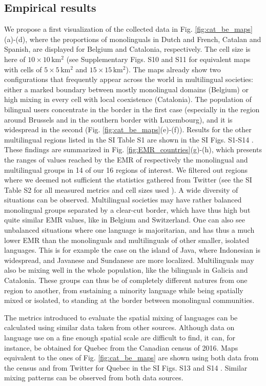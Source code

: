 \documentclass[../thesis.tex]{subfiles}
\begin{document}
\subsection{Empirical results}
We propose a first visualization of the collected data in Fig.
\ref{fig:cat_be_maps}(a)-(d), where the proportions of
monolinguals in Dutch and French, Catalan and Spanish, are displayed for Belgium and
Catalonia, respectively. The cell size is here of $10 \times 10 \, \si{\kilo \meter
\squared}$ (see Supplementary Figs. S10 and S11 \cite{supp} for equivalent maps with
cells of $5 \times 5 \, \si{\kilo \meter \squared}$ and $15 \times 15 \, \si{\kilo
\meter \squared}$). The maps already show two configurations that frequently appear
across the world in multilingual societies: either a marked boundary between mostly
monolingual domains (Belgium) or high mixing in every cell with local coexistence
(Catalonia). The population of bilingual users concentrate in the border in the first
case (especially in the region around Brussels and in the southern border with
Luxembourg), and it is widespread in the second (Fig.
\ref{fig:cat_be_maps}(e)-(f)). Results for the other
multilingual regions listed in the SI Table S1 are shown in the SI Figs. S1-S14
\cite{supp}. These findings are summarized in Fig.
\ref{fig:EMR_countries}(g)-(h), which presents the ranges of
values reached by the EMR of respectively the monolingual and multilingual groups in 14
of our 16 regions of interest. We filtered out regions where we deemed not sufficient
the statistics gathered from Twitter (see the SI Table S2 for all measured metrics and
cell sizes used \cite{supp}). A wide diversity of situations can be observed.
Multilingual societies may have rather balanced monolingual groups separated by a
clear-cut border, which have thus high but quite similar EMR values, like in Belgium and
Switzerland. One can also see unbalanced situations where one language is majoritarian,
and has thus a much lower EMR than the monolinguals and multilinguals of other smaller,
isolated languages. This is for example the case on the island of Java, where Indonesian
is widespread, and Javanese and Sundanese are more localized. Multilinguals may also be
mixing well in the whole population, like the bilinguals in Galicia and Catalonia. These
groups can thus be of completely different natures from one region to another, from
sustaining a minority language while being spatially mixed or isolated, to standing at
the border between monolingual communities.

The metrics introduced to evaluate the spatial mixing of languages can be calculated
using similar data taken from other sources. Although data on language use on a fine
enough spatial scale are difficult to find, it can, for instance, be obtained for Quebec
from the Canadian census of 2016. Maps equivalent to the ones of Fig.
\ref{fig:cat_be_maps} are shown using both data from the census and from
Twitter for Quebec in the SI Figs. S13 and S14 \cite{supp}. Similar mixing patterns can
be observed from both data sources.
\end{document}
